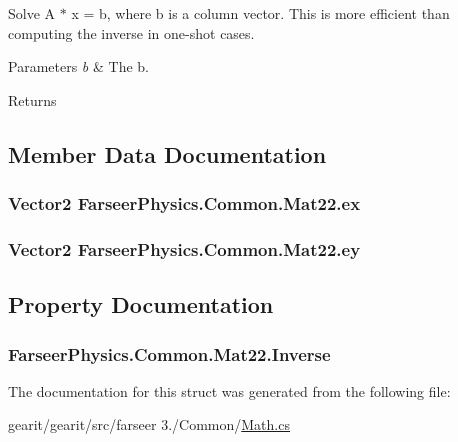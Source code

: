 Solve A $\ast$ x = b, where b is a column vector. This is more efficient than computing the inverse in one-\/shot cases. 


\begin{DoxyParams}{Parameters}
{\em b} & The b.\\
\hline
\end{DoxyParams}
\begin{DoxyReturn}{Returns}

\end{DoxyReturn}


\subsection{Member Data Documentation}
\hypertarget{struct_farseer_physics_1_1_common_1_1_mat22_aa015023e16afd7001baf3962dd4968a0}{
\subsubsection[{ex}]{\setlength{\rightskip}{0pt plus 5cm}Vector2 Farseer\+Physics.\+Common.\+Mat22.\+ex}}\label{struct_farseer_physics_1_1_common_1_1_mat22_aa015023e16afd7001baf3962dd4968a0}
\hypertarget{struct_farseer_physics_1_1_common_1_1_mat22_a96d3ed874759e3e896b0819d668e07d0}{
\subsubsection[{ey}]{\setlength{\rightskip}{0pt plus 5cm}Vector2 Farseer\+Physics.\+Common.\+Mat22.\+ey}}\label{struct_farseer_physics_1_1_common_1_1_mat22_a96d3ed874759e3e896b0819d668e07d0}


\subsection{Property Documentation}
\hypertarget{struct_farseer_physics_1_1_common_1_1_mat22_ad3c54ce6b23cc803179665459170f4df}{
\subsubsection[{Inverse}]{ Farseer\+Physics.\+Common.\+Mat22.\+Inverse\hspace{0.3cm}{\ttfamily [get]}}}\label{struct_farseer_physics_1_1_common_1_1_mat22_ad3c54ce6b23cc803179665459170f4df}


The documentation for this struct was generated from the following file\+:\begin{DoxyCompactItemize}
\item 
gearit/gearit/src/farseer 3./\+Common/\hyperlink{_math_8cs}{Math.\+cs}\end{DoxyCompactItemize}
